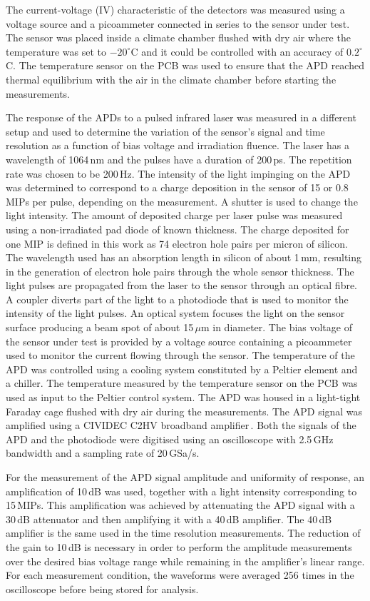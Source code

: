 \documentclass[review,number,sort&compress]{elsarticle}
\begin{document}
The current-voltage (IV) characteristic of the detectors was measured using a voltage source and a picoammeter connected in series to the sensor under test.
The sensor was placed inside a climate chamber flushed with dry air where the temperature was set to $-20^\circ$C and it could be controlled with an accuracy of $0.2^\circ$C.
The temperature sensor on the PCB was used to ensure that the APD reached thermal equilibrium with the air in the climate chamber before starting the measurements.

The response of the APDs to a pulsed infrared laser was measured in a different setup and used to determine the variation of the sensor's signal and time resolution as a function of bias voltage and irradiation fluence.
The laser has a wavelength of 1064\,nm and the pulses have a duration of 200\,ps.
The repetition rate was chosen to be 200\,Hz.
The intensity of the light impinging on the APD was determined to correspond to a charge deposition in the sensor of 15 or 0.8\,MIPs per pulse, depending on the measurement.
A shutter is used to change the light intensity.
The amount of deposited charge per laser pulse was measured using a non-irradiated pad diode of known thickness.
The charge deposited for one MIP is defined in this work as 74 electron hole pairs per micron of silicon.
The wavelength used has an absorption length in silicon of about 1\,mm, resulting in the generation of electron hole pairs through the whole sensor thickness.
The light pulses are propagated from the laser to the sensor through an optical fibre.
A coupler diverts part of the light to a photodiode that is used to monitor the intensity of the light pulses.
An optical system focuses the light on the sensor surface producing a beam spot of about 15\,$\mu$m in diameter.
The bias voltage of the sensor under test is provided by a voltage source containing a picoammeter used to monitor the current flowing through the sensor.
The temperature of the APD was controlled using a cooling system constituted by a Peltier element and a chiller.
The temperature measured by the temperature sensor on the PCB was used as input to the Peltier control system.
The APD was housed in a light-tight Faraday cage flushed with dry air during the measurements.
The APD signal was amplified using a CIVIDEC C2HV broadband amplifier\,\cite{cividec}.
Both the signals of the APD and the photodiode were digitised using an oscilloscope with 2.5\,GHz bandwidth and a sampling rate of 20\,GSa/s.

For the measurement of the APD signal amplitude and uniformity of response, an amplification of 10\,dB was used, together with a light intensity corresponding to 15\,MIPs.
This amplification was achieved by attenuating the APD signal with a 30\,dB attenuator and then amplifying it with a 40\,dB amplifier.
The 40\,dB amplifier is the same used in the time resolution measurements.
The reduction of the gain to 10\,dB is necessary in order to perform the amplitude measurements over the desired bias voltage range while remaining in the amplifier's linear range.
For each measurement condition, the waveforms were averaged 256 times in the oscilloscope before being stored for analysis.
\end{document}
